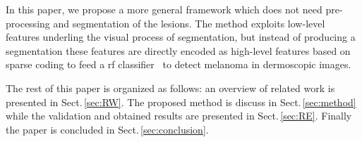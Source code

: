 In this paper, we propose a more general framework which does not need pre-processing and segmentation of the lesions.
The method exploits low-level features underling the visual process of segmentation, but instead of producing a segmentation these features are directly encoded as high-level features based on sparse coding to feed a \ac{rf} classifier~\cite{breiman2001random} to detect melanoma in dermoscopic images.  

The rest of this paper is organized as follows: an overview of related work is presented in Sect.\,\ref{sec:RW}.
The proposed method is discuss in Sect.\,\ref{sec:method} while the validation and obtained results are presented in Sect.\,\ref{sec:RE}.
Finally the paper is concluded in Sect.\,\ref{sec:conclusion}.







